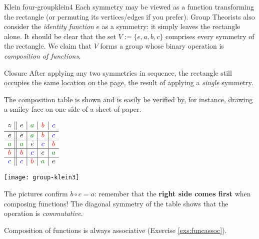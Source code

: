 \begin{example}{Klein four-group}{klein4}
	Each symmetry may be viewed as a function transforming the rectangle (or permuting its vertices/edges if you prefer). Group Theorists also consider the \emph{identity function} $e$ as a symmetry: it simply leaves the rectangle alone.\footnotemark{}\smallbreak
	It should be clear that the set $V:=\{e,a,b,c\}$ comprises every symmetry of the rectangle. We claim that $V$ forms a group whose binary operation is \emph{composition of functions.}\smallbreak
	\begin{description}
		\begin{minipage}[t]{0.8\linewidth}\vspace{-8pt}
			\item[Closure] After applying any two symmetries in sequence, the rectangle still occupies the same location on the page, the result of applying a \emph{single} symmetry.\par
				The composition table is shown and is easily be verified by, for instance, drawing a smiley face on one side of a sheet of paper.
		\end{minipage}
		\hfill
		\begin{minipage}[t]{0.19\linewidth}\vspace{-18pt}
			\flushright$\begin{array}[t]{c||c|c|c|c}
			\circ & e & \textcolor{Green}{a} & \textcolor{red}{b} & \textcolor{blue}{c}\\\hline\hline
			e & e & \textcolor{Green}{a} & \textcolor{red}{b} & \textcolor{blue}{c}\\\hline
			\textcolor{Green}{a} & \textcolor{Green}{a} & e & \textcolor{blue}{c} & \textcolor{red}{b}\\\hline
			\textcolor{red}{b} & \textcolor{red}{b} & \textcolor{blue}{c} & e & \textcolor{Green}{a}\\\hline
			\textcolor{blue}{c} & \textcolor{blue}{c} & \textcolor{red}{b} & \textcolor{Green}{a} & e
		\end{array}$
		\end{minipage}\par
		\vspace{-20pt}
		\begin{center}
			\texttt{[image: group-klein3]}\vspace{-15pt}
		\end{center}
		The pictures confirm $b\circ c=a$: remember that the \textbf{right side comes first} when composing functions! The diagonal symmetry of the table shows that the operation is \emph{commutative}.
		\item[Associativity] Composition of functions is always associative (Exercise \ref{exs:funcassoc}).

\end{description}
\end{example}
